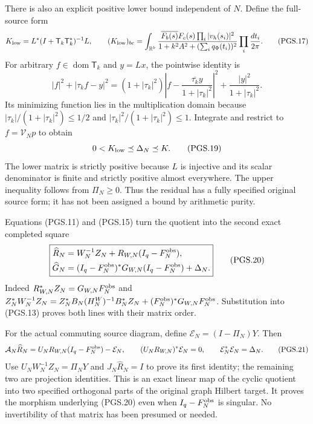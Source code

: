 There is also an explicit positive lower bound independent of \(N\).
Define the full-source form
\[
 K_{\rm low}=L^*(I+\mathsf T_k\mathsf T_k^*)^{-1}L,\qquad
 (K_{\rm low})_{bc}=\int_{\mathbb{R}^k}
   \frac{\overline{F_b(s)}F_c(s)
          \prod_i|v_h(s_i)|^2}
        {1+k^2A^2+(\sum_iq_\Phi(t_i))^2}
                  \prod_i\frac{dt_i}{2\pi}.
\tag{PGS.17}\label{GraphV2:eq:pgs-residual-bound}
\]
For arbitrary \(f\in\operatorname{dom}\mathsf T_k\) and \(y=Lx\),
the pointwise identity is
\[
 |f|^2+|\tau_k f-y|^2
  =(1+|\tau_k|^2)
       \left|f-\frac{\overline{\tau_k}y}{1+|\tau_k|^2}\right|^2
          +\frac{|y|^2}{1+|\tau_k|^2}.
\tag{PGS.18}\label{GraphV2:eq:pgs-pointwise-square}
\]
Its minimizing function lies in the multiplication domain because
\(|\tau_k|/(1+|\tau_k|^2)\le1/2\) and
\(|\tau_k|^2/(1+|\tau_k|^2)\le1\). Integrate and restrict to
\(f=\mathcal V_Np\) to obtain
\[
 0<K_{\rm low}\preceq\Delta_N\preceq K.
\tag{PGS.19}\label{GraphV2:eq:pgs-uniform-N}
\]
The lower matrix is strictly positive because \(L\) is injective
and its scalar denominator is finite and strictly positive almost
everywhere. The upper inequality follows from \(\Pi_N\ge0\).
Thus the residual has a fully specified original source form; it
has not been assigned a bound by arithmetic purity.

Equations (PGS.11) and (PGS.15) turn the quotient into the second
exact completed square
\[
\boxed{\begin{aligned}
 \widehat R_N&=W_N^{-1}Z_N+
                   R_{W,N}(I_q-F_N^{\rm obs}),\\
 \widehat G_N&=(I_q-F_N^{\rm obs})^*G_{W,N}
                   (I_q-F_N^{\rm obs})+\Delta_N.
\end{aligned}}
\tag{PGS.20}\label{GraphV2:eq:pgs-quotient-square}
\]
Indeed \(R_{W,N}^*Z_N=G_{W,N}F_N^{\rm obs}\) and
\(Z_N^*W_N^{-1}Z_N=Z_N^*B_N(H_N^W)^{-1}B_N^*Z_N
 +(F_N^{\rm obs})^*G_{W,N}F_N^{\rm obs}\).
Substitution into (PGS.13) proves both lines with their matrix order.

For the actual commuting source diagram, define
\(\mathcal E_N=(I-\Pi_N)Y\). Then
\[
 \mathcal A_N\widehat R_N
       =U_NR_{W,N}(I_q-F_N^{\rm obs})-\mathcal E_N,\qquad
 (U_NR_{W,N})^*\mathcal E_N=0,\qquad
 \mathcal E_N^*\mathcal E_N=\Delta_N.
\tag{PGS.21}\label{GraphV2:eq:pgs-orthogonal-source-map}
\]
Use \(U_NW_N^{-1}Z_N=\Pi_NY\) and \(J_N\widehat R_N=I\)
to prove its first identity; the remaining two are projection
identities. This is an exact linear map of the cyclic quotient into
two specified orthogonal parts of the original graph Hilbert target.
It proves the morphism underlying (PGS.20) even when
\(I_q-F_N^{\rm obs}\) is singular. No invertibility of that matrix
has been presumed or needed.

